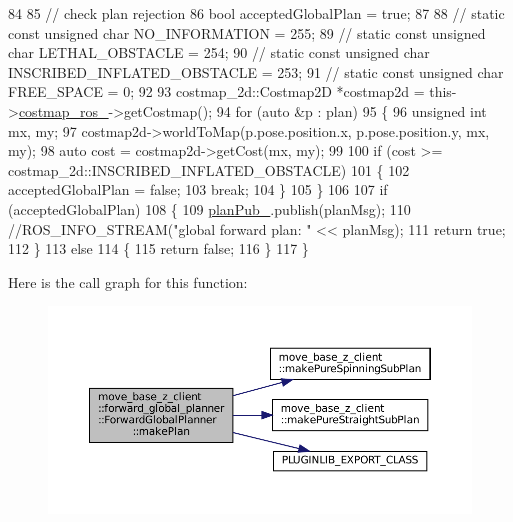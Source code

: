 \begin{DoxyCode}
84 
85     \textcolor{comment}{// check plan rejection}
86     \textcolor{keywordtype}{bool} acceptedGlobalPlan = \textcolor{keyword}{true};
87 
88     \textcolor{comment}{// static const unsigned char NO\_INFORMATION = 255;}
89     \textcolor{comment}{// static const unsigned char LETHAL\_OBSTACLE = 254;}
90     \textcolor{comment}{// static const unsigned char INSCRIBED\_INFLATED\_OBSTACLE = 253;}
91     \textcolor{comment}{// static const unsigned char FREE\_SPACE = 0;}
92 
93     costmap\_2d::Costmap2D *costmap2d = this->\hyperlink{classmove__base__z__client_1_1forward__global__planner_1_1ForwardGlobalPlanner_aba11d85f5f4c9370873195ca97497a22}{costmap\_ros\_}->getCostmap();
94     \textcolor{keywordflow}{for} (\textcolor{keyword}{auto} &p : plan)
95     \{
96         \textcolor{keywordtype}{unsigned} \textcolor{keywordtype}{int} mx, my;
97         costmap2d->worldToMap(p.pose.position.x, p.pose.position.y, mx, my);
98         \textcolor{keyword}{auto} cost = costmap2d->getCost(mx, my);
99 
100         \textcolor{keywordflow}{if} (cost >= costmap\_2d::INSCRIBED\_INFLATED\_OBSTACLE)
101         \{
102             acceptedGlobalPlan = \textcolor{keyword}{false};
103             \textcolor{keywordflow}{break};
104         \}
105     \}
106 
107     \textcolor{keywordflow}{if} (acceptedGlobalPlan)
108     \{
109         \hyperlink{classmove__base__z__client_1_1forward__global__planner_1_1ForwardGlobalPlanner_a324f5df4d47440e1ebddb83ee53d5908}{planPub\_}.publish(planMsg);
110         \textcolor{comment}{//ROS\_INFO\_STREAM("global forward plan: " << planMsg);}
111         \textcolor{keywordflow}{return} \textcolor{keyword}{true};
112     \}
113     \textcolor{keywordflow}{else}
114     \{
115         \textcolor{keywordflow}{return} \textcolor{keyword}{false};
116     \}
117 \}
\end{DoxyCode}
Here is the call graph for this function\+:
\nopagebreak
\begin{figure}[H]
\begin{center}
\leavevmode
\includegraphics[width=350pt]{classmove__base__z__client_1_1forward__global__planner_1_1ForwardGlobalPlanner_a2dcf9aad74efaaa92ee78650f7a23096_cgraph}
\end{center}
\end{figure}
